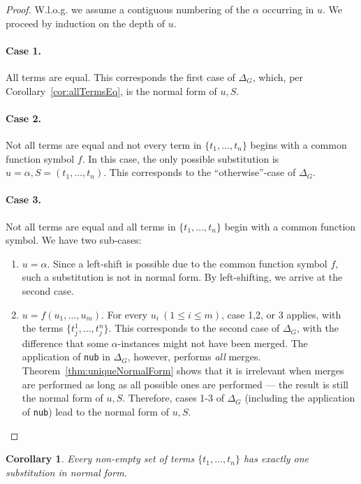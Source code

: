 \documentclass[a4paper, 11pt]{report}
\newtheorem{corollary}{Corollary}
\begin{document}
\begin{proof}
  W.l.o.g. we assume a contiguous numbering of the $\alpha$ occurring in $u$.
  We proceed by induction on the depth of $u$.

  \paragraph{Case 1.} All terms are equal. This corresponds the first case of $\Delta_G$, which, per Corollary~\ref{cor:allTermsEq}, is the normal form of $u,S$.

  \paragraph{Case 2.} Not all terms are equal and not every term in $\{t_1,\dots,t_n\}$ begins with a common function symbol $f$. In this case, the only possible substitution is $u=\alpha, S=(t_1,\dots,t_n)$. This corresponds to the ``otherwise''-case of $\Delta_G$.

  \paragraph{Case 3.} Not all terms are equal and all terms in $\{t_1,\dots,t_n\}$ begin with a common function symbol. We have two sub-cases:
  \begin{enumerate}
    \item $u=\alpha$. Since a left-shift is possible due to the common function symbol $f$, such a substitution is not in normal form. By left-shifting, we arrive at the second case.
    \item $u=f(u_1,\dots,u_m)$. For every $u_i\ (1\leq i \leq m)$, case 1,2, or 3 applies, with the terms $\{t_j^1,\dots,t_j^n \}$. This corresponds to the second case of $\Delta_G$, with the difference that some $\alpha$-instances might not have been merged. The application of \texttt{nub} in $\Delta_G$, however, performs {\em all} merges.\\
    Theorem~\ref{thm:uniqueNormalForm} shows that it is irrelevant when merges are performed as long as all possible ones are performed --- the result is still the normal form of $u,S$. Therefore, cases 1-3 of $\Delta_G$ (including the application of \texttt{nub}) lead to the normal form of $u,S$.
  \end{enumerate}
\end{proof}

\begin{corollary}
  Every non-empty set of terms $\{t_1,\dots,t_n\}$ has exactly one substitution in normal form.
\end{corollary}
\end{document}
